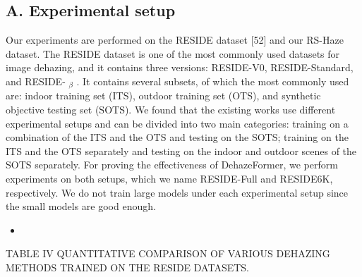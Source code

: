 \documentclass{article}
\begin{document}
\subsection{A. Experimental setup}


Our experiments are performed on the RESIDE dataset [52] and our RS-Haze dataset. The RESIDE dataset is one of the most commonly used datasets for image dehazing, and it contains three versions: RESIDE-V0, RESIDE-Standard, and RESIDE- $_{\beta}$ . It contains several subsets, of which the most commonly used are: indoor training set (ITS), outdoor training set (OTS), and synthetic objective testing set (SOTS). We found that the existing works use different experimental setups and can be divided into two main categories: training on a combination of the ITS and the OTS and testing on the SOTS; training on the ITS and the OTS separately and testing on the indoor and outdoor scenes of the SOTS separately. For proving the effectiveness of DehazeFormer, we perform experiments on both setups, which we name RESIDE-Full and RESIDE6K, respectively. We do not train large models under each experimental setup since the small models are good enough.


\begin{itemize}
\item %

\end{itemize}

TABLE IV QUANTITATIVE COMPARISON OF VARIOUS DEHAZING METHODS TRAINED ON THE RESIDE DATASETS.
\end{document}
